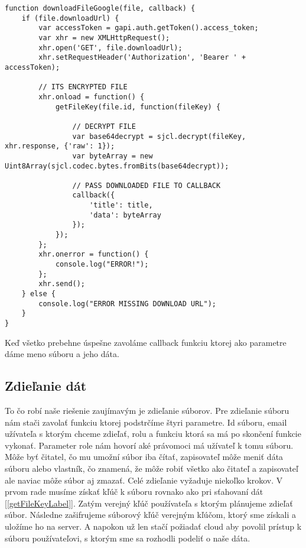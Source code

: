 \begin{lstlisting}[caption=Stiahnutie súboru, firstnumber=27]	
function downloadFileGoogle(file, callback) {
    if (file.downloadUrl) {
        var accessToken = gapi.auth.getToken().access_token;
        var xhr = new XMLHttpRequest();
        xhr.open('GET', file.downloadUrl);
        xhr.setRequestHeader('Authorization', 'Bearer ' + accessToken);
        
        // ITS ENCRYPTED FILE
        xhr.onload = function() {
            getFileKey(file.id, function(fileKey) {

                // DECRYPT FILE
                var base64decrypt = sjcl.decrypt(fileKey, xhr.response, {'raw': 1});
                var byteArray = new Uint8Array(sjcl.codec.bytes.fromBits(base64decrypt));

                // PASS DOWNLOADED FILE TO CALLBACK
                callback({
                    'title': title,
                    'data': byteArray
                });
            });
        };
        xhr.onerror = function() {
            console.log("ERROR!");
        };
        xhr.send();
    } else {
        console.log("ERROR MISSING DOWNLOAD URL");
    }
}
\end{lstlisting}

		Keď všetko prebehne úspešne zavoláme callback funkciu ktorej ako parametre dáme meno súboru a jeho dáta. 
	
	\subsection{Zdieľanie dát}
		
		To čo robí naše riešenie zaujímavým je zdieľanie súborov. Pre zdieľanie súboru nám stači zavolať funkciu ktorej podstrčíme štyri parametre. Id súboru, email užívateľa s ktorým chceme zdieľať, rolu a funkciu ktorá sa má po skončení funkcie vykonať. Parameter role nám hovorí aké právomoci má užívateľ k tomu súboru. Môže byť čitatel, čo mu umožní súbor iba čítať, zapisovateľ môže meniť dáta súboru alebo vlastník, čo znamená, že môže robiť všetko ako čitateľ a zapisovateľ ale naviac môže súbor aj zmazať. Celé zdieľanie vyžaduje niekoľko krokov. V prvom rade musíme získať kľúč k súboru rovnako ako pri sťahovaní dát [\ref{getFileKeyLabel}]. Zatým verejný kľúč používateľa s ktorým plánujeme zdieľať súbor. Následne zašifrujeme súborový kľúč verejným kľúčom, ktorý sme získali a uložíme ho na server. A napokon už len stačí požiadať cloud aby povolil prístup k súboru používateľovi, s ktorým sme sa rozhodli podeliť o naše dáta.
		
